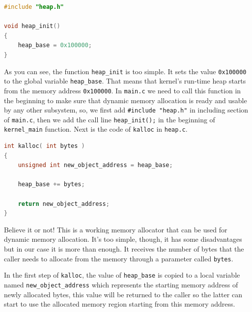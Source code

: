 \begin{lstlisting}[language=C]
#include "heap.h"

void heap_init()
{
    heap_base = 0x100000;
}
\end{lstlisting}

As you can see, the function \lstinline!heap_init! is too simple. It
sets the value \lstinline!0x100000! to the global variable
\lstinline!heap_base!. That means that kernel's run-time heap starts
from the memory address \lstinline!0x100000!. In \lstinline!main.c! we
need to call this function in the beginning to make sure that dynamic
memory allocation is ready and usable by any other subsystem, so, we
first add \lstinline!#include "heap.h"! in including section of
\lstinline!main.c!, then we add the call line \lstinline!heap_init();!
in the beginning of \lstinline!kernel_main! function. Next is the code
of \lstinline!kalloc! in \lstinline!heap.c!.

\begin{lstlisting}[language=C]
int kalloc( int bytes )
{
    unsigned int new_object_address = heap_base;
    
    heap_base += bytes;
    
    return new_object_address;
}
\end{lstlisting}

Believe it or not! This is a working memory allocator that can be used
for dynamic memory allocation. It's too simple, though, it has some
disadvantages but in our case it is more than enough. It receives the
number of bytes that the caller needs to allocate from the memory
through a parameter called \lstinline!bytes!.

In the first step of \lstinline!kalloc!, the value of
\lstinline!heap_base! is copied to a local variable named
\lstinline!new_object_address! which represents the starting memory
address of newly allocated bytes, this value will be returned to the
caller so the latter can start to use the allocated memory region
starting from this memory address.

